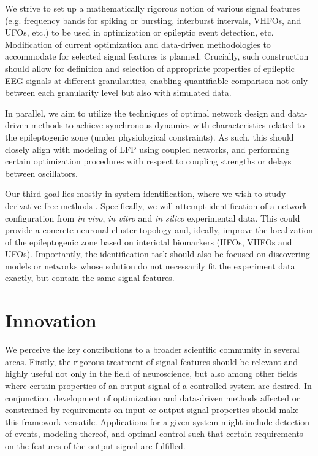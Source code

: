 \documentclass[a4paper,11pt]{scrartcl}
\begin{document}
We strive to set up a mathematically rigorous notion of various signal features (e.g. frequency bands for spiking or bursting, interburst intervals, VHFOs, and UFOs, etc.) \cite{Wedler2022} to be used in optimization or epileptic event detection, etc. Modification of current optimization and data-driven methodologies to accommodate for selected signal features is planned. Crucially, such construction should allow for definition and selection of appropriate properties of epileptic EEG signals at different granularities, enabling quantifiable comparison not only between each granularity level but also with simulated data.

In parallel, we aim to utilize the techniques of optimal network design and data-driven methods \cite{Baggio2021} to achieve synchronous dynamics with characteristics related to the epileptogenic zone (under physiological constraints). As such, this should closely align with modeling of LFP using coupled networks, and performing certain optimization procedures with respect to coupling strengths or delays between oscillators. 

Our third goal lies mostly in system identification, where we wish to study derivative-free methods \cite{Bortz2023, Messenger2024}. Specifically, we will attempt identification of a network configuration from \textit{in vivo}, \textit{in vitro} and \textit{in silico} experimental data. This could provide a concrete neuronal cluster topology and, ideally, improve the localization of the epileptogenic zone based on interictal biomarkers (HFOs, VHFOs and UFOs). Importantly, the identification task should also be focused on discovering models or networks whose solution do not necessarily fit the experiment data exactly, but contain the same signal features.

\section{Innovation}\label{sec:innovation}

We perceive the key contributions to a broader scientific community in several areas. Firstly, the rigorous treatment of signal features should be relevant and highly useful not only in the field of neuroscience, but also among other fields where certain properties of an output signal of a controlled system are desired. In conjunction, development of optimization and data-driven methods affected or constrained by requirements on input or output signal properties should make this framework versatile. Applications for a given system might include detection of events, modeling thereof, and optimal control such that certain requirements on the features of the output signal are fulfilled.
\end{document}

